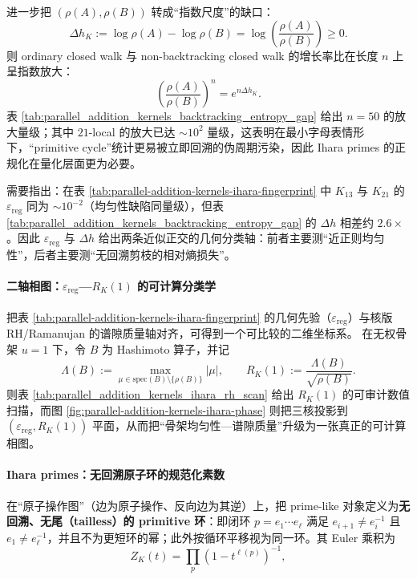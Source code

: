 \begin{remark}\label{rem:ihara-entropy-gap}
进一步把 \((\rho(A),\rho(B))\) 转成“指数尺度”的缺口：
\[
\Delta h_K:=\log\rho(A)-\log\rho(B)=\log\!\left(\frac{\rho(A)}{\rho(B)}\right)\ge 0.
\]
则 ordinary closed walk 与 non-backtracking closed walk 的增长率比在长度 \(n\) 上呈指数放大：
\[
\left(\frac{\rho(A)}{\rho(B)}\right)^n=e^{n\Delta h_K}.
\]
表 \ref{tab:parallel_addition_kernels_backtracking_entropy_gap} 给出 \(n=50\) 的放大量级；其中 \(21\)-local 的放大已达 \(\sim 10^2\) 量级，这表明在最小字母表情形下，“primitive cycle”统计更易被立即回溯的伪周期污染，因此 Ihara primes 的正规化在量化层面更为必要。


需要指出：在表 \ref{tab:parallel-addition-kernels-ihara-fingerprint} 中 \(K_{13}\) 与 \(K_{21}\) 的 \(\varepsilon_{\mathrm{reg}}\) 同为 \(\sim 10^{-2}\)（均匀性缺陷同量级），但表 \ref{tab:parallel_addition_kernels_backtracking_entropy_gap} 的 \(\Delta h\) 相差约 \(2.6\times\)。因此 \(\varepsilon_{\mathrm{reg}}\) 与 \(\Delta h\) 给出两条近似正交的几何分类轴：前者主要测“近正则均匀性”，后者主要测“无回溯剪枝的相对熵损失”。
\end{remark}

\paragraph{二轴相图：\texorpdfstring{$\varepsilon_{\mathrm{reg}}$}{eps_reg}—\texorpdfstring{$R_K(1)$}{RK(1)} 的可计算分类学}
把表 \ref{tab:parallel-addition-kernels-ihara-fingerprint} 的几何先验（\(\varepsilon_{\mathrm{reg}}\)）与核版 RH/Ramanujan 的谱隙质量轴对齐，可得到一个可比较的二维坐标系。
在无权骨架 \(u=1\) 下，令 \(B\) 为 Hashimoto 算子，并记
\[
\Lambda(B):=\max_{\mu\in\mathrm{spec}(B)\setminus\{\rho(B)\}}|\mu|,
\qquad
R_K(1):=\frac{\Lambda(B)}{\sqrt{\rho(B)}}.
\]
则表 \ref{tab:parallel_addition_kernels_ihara_rh_scan} 给出 \(R_K(1)\) 的可审计数值扫描，而图 \ref{fig:parallel-addition-kernels-ihara-phase} 则把三核投影到 \((\varepsilon_{\mathrm{reg}},R_K(1))\) 平面，从而把“骨架均匀性—谱隙质量”升级为一张真正的可计算相图。



\paragraph{Ihara primes：无回溯原子环的规范化素数}
在“原子操作图”（边为原子操作、反向边为其逆）上，把 prime-like 对象定义为\textbf{无回溯、无尾（tailless）的 primitive 环}：即闭环 $p=e_1\cdots e_\ell$ 满足 $e_{i+1}\neq e_i^{-1}$ 且 $e_1\neq e_\ell^{-1}$，并且不为更短环的幂；此外按循环平移视为同一环。其 Euler 乘积为
\[
Z_K(t)=\prod_{p}\left(1-t^{\ell(p)}\right)^{-1},
\]
